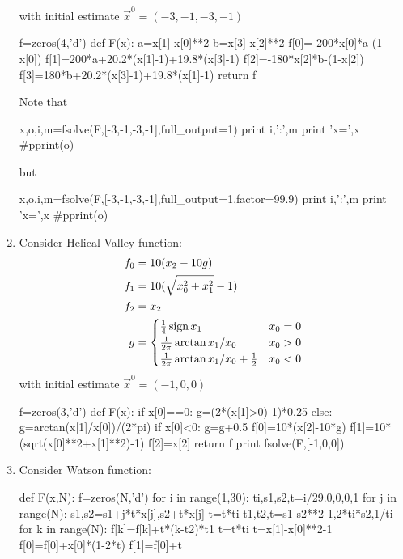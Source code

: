 \begin{enumerate}
\begin{displaymath}
  \end{displaymath}
  with initial estimate $\vec x^0=(-3,-1,-3,-1)$
\begin{python}
f=zeros(4,'d')
def F(x):
    a=x[1]-x[0]**2
    b=x[3]-x[2]**2
    f[0]=-200*x[0]*a-(1-x[0])
    f[1]=200*a+20.2*(x[1]-1)+19.8*(x[3]-1)
    f[2]=-180*x[2]*b-(1-x[2])
    f[3]=180*b+20.2*(x[3]-1)+19.8*(x[1]-1)
    return f
\end{python}
Note that
\begin{pythonrun}
x,o,i,m=fsolve(F,[-3,-1,-3,-1],full_output=1)
print i,':',m
print 'x=',x
#pprint(o)
\end{pythonrun}
but
\begin{pythonrun}
x,o,i,m=fsolve(F,[-3,-1,-3,-1],full_output=1,factor=99.9)
print i,':',m
print 'x=',x
#pprint(o)
\end{pythonrun}
\item Consider Helical Valley function:
  \begin{displaymath}
    \begin{split}
      f_0&=10(x_2-10 g)\\
      f_1&=10(\sqrt{x_0^2+x_1^2}-1)\\
      f_2&=x_2\\
      g&=
      \begin{cases}
        \frac14\operatorname{sign} x_1 & x_0=0\\
        \frac1{2\pi}\arctan x_1/x_0 & x_0>0\\
        \frac1{2\pi}\arctan x_1/x_0+\frac12 & x_0<0
      \end{cases}
    \end{split}
  \end{displaymath}
  with initial estimate $\vec x^0=(-1,0,0)$
\begin{pythonrun}
f=zeros(3,'d')
def F(x):
    if x[0]==0: g=(2*(x[1]>0)-1)*0.25
    else: g=arctan(x[1]/x[0])/(2*pi)
    if x[0]<0: g=g+0.5
    f[0]=10*(x[2]-10*g)
    f[1]=10*(sqrt(x[0]**2+x[1]**2)-1)
    f[2]=x[2]
    return f
print fsolve(F,[-1,0,0])
\end{pythonrun}
\item Consider Watson function:
\begin{pythonrun}
def F(x,N):
    f=zeros(N,'d')
    for i in range(1,30):
        ti,s1,s2,t=i/29.0,0,0,1
        for j in range(N):
            s1,s2=s1+j*t*x[j],s2+t*x[j]
            t=t*ti
        t1,t2,t=s1-s2**2-1,2*ti*s2,1/ti
        for k in range(N):
            f[k]=f[k]+t*(k-t2)*t1
            t=t*ti
    t=x[1]-x[0]**2-1
    f[0]=f[0]+x[0]*(1-2*t)
    f[1]=f[0]+t

\end{pythonrun}
\end{enumerate}
